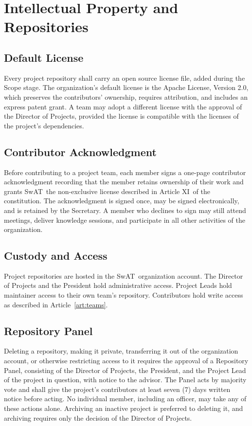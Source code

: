 \documentclass[12pt,letterpaper]{article} %
\newcommand{\orgshort}{SwAT}
\newcommand{\constIP}{Article XI}               %
\begin{document}
\section{Intellectual Property and Repositories}\label{art:ip}
\subsection{Default License}\label{sec:default-license}
Every project repository shall carry an open source license file, added during the Scope stage.
The organization's default license is the Apache License, Version 2.0, which preserves the
contributors' ownership, requires attribution, and includes an express patent grant. A team may
adopt a different license with the approval of the Director of Projects, provided the license is
compatible with the licenses of the project's dependencies.
\subsection{Contributor Acknowledgment}\label{sec:contributor-ack}
Before contributing to a project team, each member signs a one-page contributor acknowledgment
recording that the member retains ownership of their work and grants \orgshort\ the
non-exclusive license described in \constIP\ of the constitution. The acknowledgment is signed
once, may be signed electronically, and is retained by the Secretary. A member who declines to
sign may still attend meetings, deliver knowledge sessions, and participate in all other
activities of the organization.
\subsection{Custody and Access}\label{sec:repo-custody}
Project repositories are hosted in the \orgshort\ organization account. The Director of Projects
and the President hold administrative access. Project Leads hold maintainer access to their own
team's repository. Contributors hold write access as described in Article~\ref{art:teams}.
\subsection{Repository Panel}\label{sec:repo-panel}
Deleting a repository, making it private, transferring it out of the organization account, or
otherwise restricting access to it requires the approval of a Repository Panel, consisting of the
Director of Projects, the President, and the Project Lead of the project in question, with notice
to the advisor. The Panel acts by majority vote and shall give the project's contributors at
least seven (7) days written notice before acting. No individual member, including an officer,
may take any of these actions alone. Archiving an inactive project is preferred to deleting it,
and archiving requires only the decision of the Director of Projects.
\end{document}
